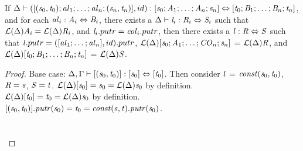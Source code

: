 \begin{lemma}
\label{lem:id-clause}
If $\Delta \vdash ([(\mathit{s}_0,\mathit{t}_0);\mathit{al}_1 ; \ldots ; \mathit{al}_n;(\mathit{s}_n,\mathit{t}_n)],id) : [\mathit{s}_0 ; \mathit{A}_1 ; \ldots ; \mathit{A}_n; \mathit{s}_n] \Leftrightarrow [\mathit{t}_0 ; \mathit{B}_1 ; \ldots ; \mathit{B}_n ; \mathit{t}_n]$,
and for each $\mathit{al}_i : \mathit{A}_i \Leftrightarrow \mathit{B}_i$,
there exists a $\Delta \vdash \mathit{l}_i : \mathit{R}_i \Leftrightarrow \mathit{S}_i$ such that
$\mathcal{L}(\Delta){\mathit{A}_i}=\mathcal{L}(\Delta){\mathit{R}_i}$, and $\mathit{l}_i.putr = \mathit{col}_i.putr$,
then there exists a $\mathit{l} : \mathit{R} \Leftrightarrow \mathit{S}$ such that $\mathit{l}.putr = ([\mathit{al}_1 ; \ldots ; \mathit{al}_n],id).putr$, $\mathcal{L}(\Delta){[\mathit{s}_0 ; \mathit{A}_1 ; \ldots ; \mathit{CO}_n ; \mathit{s}_n]}$ = $\mathcal{L}(\Delta){\mathit{R}}$,
and $\mathcal{L}(\Delta){[\mathit{t}_0 ; \mathit{B}_1 ; \ldots ; \mathit{B}_n ; \mathit{t}_n]}$ = $\mathcal{L}(\Delta){\mathit{S}}$.
\begin{proof}
Base case: $\Delta, \Gamma \vdash [(\mathit{s}_0,\mathit{t}_0)] : [\mathit{s}_0] \Leftrightarrow [\mathit{t}_0]$.
Then consider $\mathit{l}$ = $\mathit{const}(\mathit{s}_0,\mathit{t}_0)$, $\mathit{R} = \mathit{s}$, $\mathit{S} = \mathit{t}$.
$\mathcal{L}(\Delta){[\mathit{s}_0]} = \mathit{s}_0 = \mathcal{L}(\Delta){\mathit{s}_0}$ by definition.\\
$\mathcal{L}(\Delta){[\mathit{t}_0]} = \mathit{t}_0 = \mathcal{L}(\Delta){\mathit{s}_0}$ by definition.\\
$[(\mathit{s}_0,\mathit{t}_0)].\mathit{putr}(\mathit{s}_0)=\mathit{t}_0=\mathit{const}(\mathit{s},\mathit{t}).\mathit{putr}(\mathit{s}_0)$.
\\\\\\


\end{proof}
\end{lemma}
